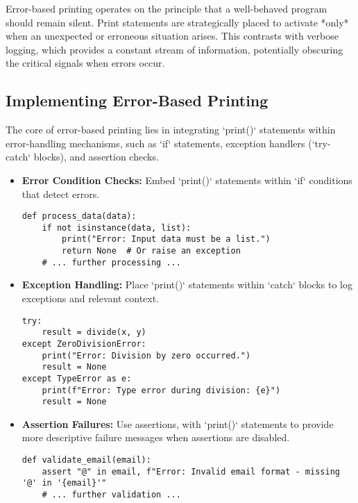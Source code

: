\documentclass{article}
\begin{document}
{{{Error-based printing operates on the principle that a well-behaved program should remain silent. Print statements are strategically placed to activate *only* when an unexpected or erroneous situation arises. This contrasts with verbose logging, which provides a constant stream of information, potentially obscuring the critical signals when errors occur.

\subsection*{Implementing Error-Based Printing}

The core of error-based printing lies in integrating `print()` statements within error-handling mechanisms, such as `if` statements, exception handlers (`try-catch` blocks), and assertion checks.

\begin{itemize}
    \item \textbf{Error Condition Checks:} Embed `print()` statements within `if` conditions that detect errors.

\begin{verbatim}
def process_data(data):
    if not isinstance(data, list):
        print("Error: Input data must be a list.")
        return None  # Or raise an exception
    # ... further processing ...
\end{verbatim}

    \item \textbf{Exception Handling:} Place `print()` statements within `catch` blocks to log exceptions and relevant context.

\begin{verbatim}
try:
    result = divide(x, y)
except ZeroDivisionError:
    print("Error: Division by zero occurred.")
    result = None
except TypeError as e:
    print(f"Error: Type error during division: {e}")
    result = None
\end{verbatim}

    \item \textbf{Assertion Failures:} Use assertions, with `print()` statements to provide more descriptive failure messages when assertions are disabled.

\begin{verbatim}
def validate_email(email):
    assert "@" in email, f"Error: Invalid email format - missing '@' in '{email}'"
    # ... further validation ...
\end{verbatim}

\end{itemize}

}}}
\end{document}
